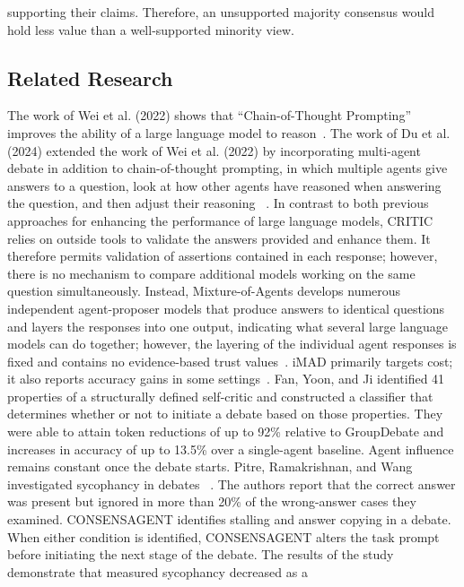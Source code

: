 supporting their claims. Therefore, an unsupported majority consensus would hold less value than a well-supported minority view.

\subsection{Related Research}
\label{subsec:related-research}

The work of Wei et al. (2022) shows that ``Chain-of-Thought Prompting''
improves the ability of a large language model to reason~\cite{wei2022chain}.
The work of Du et al. (2024) extended the work of Wei et al. (2022) by
incorporating multi-agent debate in addition to chain-of-thought prompting,
in which multiple agents give answers to a question, look at how other agents
have reasoned when answering the question, and then adjust their reasoning
~\cite{du2024improving}. In contrast to both previous approaches for enhancing the performance of
large language models, CRITIC~\cite{gou2024critic} relies on outside tools
to validate the answers provided and enhance them. It therefore permits
validation of assertions contained in each response; however, there is no
mechanism to compare additional models working on the same question
simultaneously. Instead, Mixture-of-Agents develops numerous independent
agent-proposer models that produce answers to identical questions and layers
the responses into one output, indicating what several large language models
can do together; however, the layering of the individual agent responses is
fixed and contains no evidence-based trust values~\cite{wang2025mixture}.
iMAD primarily targets cost; it also reports accuracy gains in some settings~\cite{fan2026imad}. Fan, Yoon,
and Ji identified 41 properties of a structurally defined self-critic and
constructed a classifier that determines whether or not to initiate a debate
based on those properties. They were able to attain token reductions of up to
92\% relative to GroupDebate and increases in accuracy of up to 13.5\% over
a single-agent baseline. Agent influence remains constant once the debate starts. Pitre, Ramakrishnan, and Wang investigated sycophancy in debates
~\cite{pitre-etal-2025-consensagent}. The authors report that the correct answer was present but ignored in more than 20\% of the wrong-answer cases they examined. CONSENSAGENT identifies stalling and
answer copying in a debate. When either condition is identified, CONSENSAGENT
alters the task prompt before initiating the next stage of the debate. The
results of the study demonstrate that measured sycophancy decreased as a
